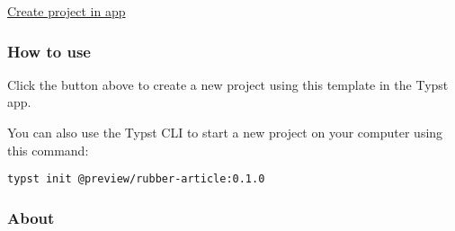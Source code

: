 \href{/app?template=rubber-article&version=0.1.0}{Create project in app}

\subsubsection{How to use}\label{how-to-use}

Click the button above to create a new project using this template in
the Typst app.

You can also use the Typst CLI to start a new project on your computer
using this command:

\begin{verbatim}
typst init @preview/rubber-article:0.1.0
\end{verbatim}



\subsubsection{About}\label{about}

